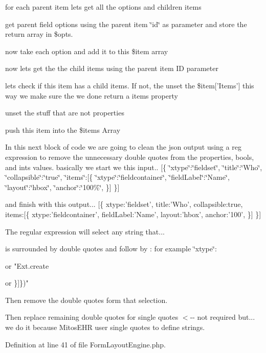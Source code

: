 for each parent item lets get all the options and children items

get parent field options using the parent item \char`\"{}id\char`\"{} as parameter and store the return array in \$opts.

now take each option and add it to this \$item array

now lets get the the child items using the parent item \-I\-D parameter

lets check if this item has a child items. \-If not, the unset the \$item\mbox{[}'\-Items'\mbox{]} this way we make sure the we done return a items property

unset the stuff that are not properties

push this item into the \$items \-Array

\-In this next block of code we are going to clean the json output using a reg expression to remove the unnecessary double quotes from the properties, bools, and ints values. basically we start we this input.. {\ttfamily  \mbox{[}\{ \char`\"{}xtype\char`\"{}\-:\char`\"{}fieldset\char`\"{}, \char`\"{}title\char`\"{}\-:\char`\"{}\-Who\char`\"{}, \char`\"{}collapsible\char`\"{}\-:\char`\"{}true\char`\"{}, \char`\"{}items\char`\"{}\-:\mbox{[}\{ \char`\"{}xtype\char`\"{}\-:\char`\"{}fieldcontainer\char`\"{}, \char`\"{}field\-Label\char`\"{}\-:\char`\"{}\-Name\char`\"{}, \char`\"{}layout\char`\"{}\-:\char`\"{}hbox\char`\"{}, \char`\"{}anchor\char`\"{}\-:\char`\"{}100\%\char`\"{}, \}\mbox{]} \}\mbox{]} } 

and finish with this output... {\ttfamily  \mbox{[}\{ xtype\-:'fieldset', title\-:'\-Who', collapsible\-:true, items\-:\mbox{[}\{ xtype\-:'fieldcontainer', field\-Label\-:'\-Name', layout\-:'hbox', anchor\-:'100', \}\mbox{]} \}\mbox{]} } 

\-The regular expression will select any string that...

is surrounded by double quotes and follow by \-: for example \char`\"{}xtype\char`\"{}\-: 

or "\-Ext.\-create

or \}\mbox{]}\})"

\-Then remove the double quotes form that selection.

\-Then replace remaining double quotes for single quotes $<$-\/-\/ not required but... we do it because \-Mitos\-E\-H\-R user single quotes to define strings.

\-Definition at line 41 of file \-Form\-Layout\-Engine.\-php.


